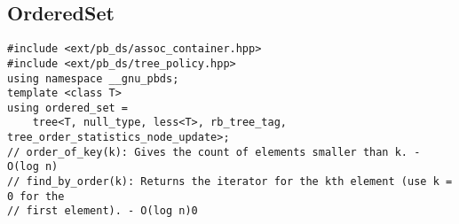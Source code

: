 \documentclass[twoside]{article}
\begin{document}
\begin{multicols*}{2}
\begin{verbatim}
\end{verbatim}

{
\subsection*{OrderedSet}
}
\begin{verbatim}
#include <ext/pb_ds/assoc_container.hpp>
#include <ext/pb_ds/tree_policy.hpp>
using namespace __gnu_pbds;
template <class T>
using ordered_set =
    tree<T, null_type, less<T>, rb_tree_tag, tree_order_statistics_node_update>;
// order_of_key(k): Gives the count of elements smaller than k. - O(log n)
// find_by_order(k): Returns the iterator for the kth element (use k = 0 for the
// first element). - O(log n)0
\end{verbatim}

{
}
\end{multicols*}
\end{document}
